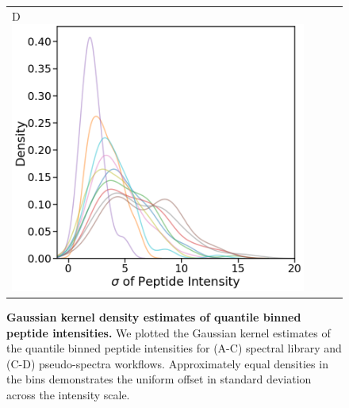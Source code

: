 \documentclass[11pt]{article}
\begin{document}
\begin{figure}[hbt]
\begin{tabular}{lclc}
        D \includegraphics[width=0.5\linewidth]{../../result/mu_sigma_variance_plots/diann/diann_kde_nolog_qvalFiltered_pepFiltered_qbinned.png} & \\%
    \end{tabular}
  \caption{{\bf Gaussian kernel density estimates of quantile binned peptide intensities.} We plotted the Gaussian kernel estimates of the quantile binned peptide intensities for (A-C) spectral library and (C-D) pseudo-spectra workflows. Approximately equal densities in the bins demonstrates the uniform offset in standard deviation across the intensity scale. \label{fig:mu_sigma_KDE}}
\end{figure}
\end{document}
